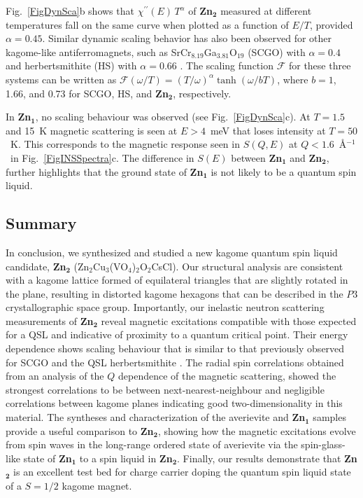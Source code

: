 \documentclass[
sn-nature,
Numbered,
iicol]
{sn-jnl}%
\newcommand{\Ang}{\AA$^{-1}$}
\newcommand{\zntwoave}{Zn$_2$Cu$_3$(VO$_4$)$_{2}$O$_2$CsCl}
\begin{document}
Fig.~\ref{FigDynSca}b shows that $\chi^{\prime\prime}(E) \,T^{\alpha}$ of {\bf Zn$\mathbf {_2}$} measured at different temperatures fall on the same curve when plotted as a function of $E/T$, provided $\alpha=0.45$. 
Similar dynamic scaling behavior has also been observed for other kagome-like antiferromagnets, such as 
SrCr$_{8.19}$Ga$_{3.81}$O$_{19}$ (SCGO) with $\alpha=0.4$ \cite{Mondelli2000TemperatureSCGO}
and herbertsmithite (HS) with $\alpha=0.66$ \cite{Helton2010DynamicHerbertsmithite}. 
The scaling function $\mathcal{F}$ for these three systems can be written as
$\mathcal{F}(\omega / T) = (T/ \omega)^{\alpha} \tanh(\omega/b T)$,  
where $b=1$, 1.66, and 0.73 for SCGO, HS, and {\bf Zn$\mathbf {_2}$}, respectively. 

In {\bf Zn$\mathbf {_1}$}, no scaling behaviour was observed (see Fig.~\ref{FigDynSca}c). 
At $T=1.5$ and 15~K magnetic scattering is seen at $E>4$~meV that loses intensity at $T=50$~K. 
This corresponds to the magnetic response seen in $S(Q,E)$ at $Q<1.6$~\Ang\ in Fig.~\ref{FigINSSpectra}c. 
The difference in $S(E)$ between {\bf Zn$\mathbf {_1}$} and {\bf Zn$\mathbf {_2}$}, further highlights that the ground state of {\bf Zn$\mathbf {_1}$} is not likely to be a quantum spin liquid.

\subsection{Summary}
\label{SecSummary}

In conclusion, we synthesized and studied a new kagome quantum spin liquid candidate, {\bf Zn$\mathbf {_2}$} (\zntwoave).
Our structural analysis are consistent with a kagome lattice formed of equilateral triangles that are slightly rotated in the plane, resulting in distorted kagome hexagons that can be described in the $P3$ crystallographic space group.
Importantly, our inelastic neutron scattering measurements of {\bf Zn$\mathbf {_2}$} reveal magnetic excitations compatible with those expected for a QSL and indicative of proximity to a quantum critical point. 
Their energy dependence shows scaling behaviour that is similar to that previously observed for SCGO and the QSL herbertsmithite \cite{Mondelli2000TemperatureSCGO, Helton2010DynamicHerbertsmithite}. 
The radial spin correlations obtained from an analysis of the $Q$ dependence of the magnetic scattering, showed the strongest correlations to be between next-nearest-neighbour and negligible correlations between kagome planes indicating good two-dimensionality in this material. 
The syntheses and characterization of the averievite and {\bf Zn$\mathbf {_1}$} samples provide a useful comparison to {\bf Zn$\mathbf {_2}$}, showing how the magnetic excitations evolve from spin waves in the long-range ordered state of averievite via the spin-glass-like state of {\bf Zn$\mathbf {_1}$} to a spin liquid in {\bf Zn$\mathbf {_2}$}. 
Finally, our results demonstrate that {\bf Zn$\mathbf {_2}$} is an excellent test bed for charge carrier doping the quantum spin liquid state of a $S = 1/2$ kagome magnet.
\end{document}
